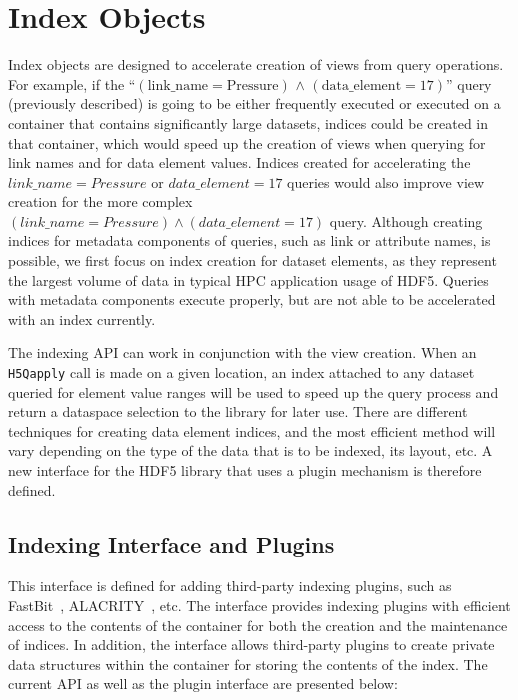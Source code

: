 \section{Index Objects}
Index objects are designed to accelerate creation of views from query operations.
For example, if the ``$\mathrm{(link\_name = Pressure)}$
$\mathrm{\land}$ $\mathrm{(data\_element = 17)}$'' query
(previously described) is going to be either frequently executed or executed
on a container that contains significantly large datasets, indices
could be created in that container, which would speed up the
creation of views when querying for link names and for data element values.
Indices created for accelerating the $link\_name = Pressure$ or $data\_element = 17$ queries
would also improve view creation for the more complex
$(link\_name = Pressure)\land(data\_element = 17)$ query.
Although creating indices for metadata components of queries, such as link or
attribute names, is possible, we first focus on index creation for dataset elements,
as they represent the largest volume of data in typical HPC application usage of
HDF5. Queries with metadata components execute properly,
but are not able to be accelerated with an index currently.

The indexing API can work in conjunction with the view creation. When an \texttt{H5Qapply}
call is made on a given location, an index attached to any dataset queried
for element value ranges will be used to speed up the query process and return
a dataspace selection to the library for later use.
There are different techniques for creating data element indices, and the most
efficient method will vary depending on the type of the data that is to be
indexed, its layout, etc. A new interface for the HDF5 library that uses a
plugin mechanism is therefore defined.

\subsection{Indexing Interface and Plugins}

This interface is defined for adding third-party indexing plugins,
such as FastBit~\cite{Wu05}, ALACRITY~\cite{alacrity13}, etc.
The interface provides indexing plugins with efficient access to the contents of
the container for both the creation and the maintenance of indices. In addition,
the interface allows third-party plugins to create private data structures
within the container for storing the contents of the index.
The current API as well as the plugin interface are presented below:

